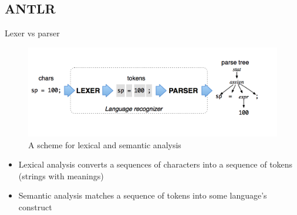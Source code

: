 \documentclass{beamer}
\begin{document}

\subsection{ANTLR}

\begin{frame}{Lexer vs parser}
	
	\begin{figure}
		\includegraphics[width=\textwidth]{img/lexer_parser_scheme}
		\vskip -1.2cm
		\caption{\label{fig:your-figure}A scheme for lexical and semantic analysis\footnotemark}
	\end{figure}
	
	
	
	\begin{itemize}
		\item Lexical analysis converts a sequences of characters into a sequence of tokens (strings with meanings)
		\item Semantic analysis matches a sequence of tokens into some language's construct
	\end{itemize}
	
	
	
	
\end{frame}
\end{document}
